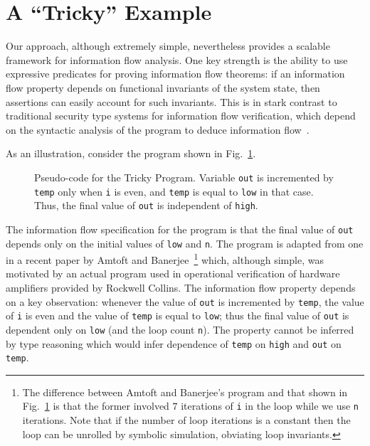 \documentclass[conference]{IEEEtran}
\begin{document}
\section{A ``Tricky'' Example}
\label{sec:tricky}

Our approach, although extremely simple, nevertheless provides a
scalable framework for information flow analysis.  One key strength is
the ability to use expressive predicates for proving information flow
theorems: if an information flow property depends on functional
invariants of the system state, then assertions can easily account for
such invariants.  This is in stark contrast to traditional security
type systems for information flow verification, which depend on the
syntactic analysis of the program to deduce information
flow~\cite{sm}.

As an illustration, consider the program shown in
Fig.~\ref{fig:tricky}.
\begin{figure}
\begin{center}
\fbox{
\begin{minipage}{3.0in}

\end{minipage}
}
\end{center}
\caption{Pseudo-code for the Tricky Program.  Variable {\tt out} is
incremented by {\tt temp} only when {\tt i} is even, and {\tt temp} is
equal to {\tt low} in that case.  Thus, the final value of {\tt out}
is independent of {\tt high}.}
\label{fig:tricky}
\end{figure}
The information flow specification for the program is that the final
value of {\tt out} depends only on the initial values of {\tt low} and
{\tt n}.  The program is adapted from one in a recent paper by Amtoft
and Banerjee~\cite{tricky}\footnote{The difference between Amtoft and
Banerjee's program and that shown in Fig.~\ref{fig:tricky} is that the
former involved $7$ iterations of {\tt i} in the loop while we use
{\tt n} iterations.  Note that if the number of loop iterations is a
constant then the loop can be unrolled by symbolic simulation,
obviating loop invariants.}  which, although simple, was motivated by
an actual program used in operational verification of hardware
amplifiers provided by Rockwell Collins.  The information flow
property depends on a key observation: whenever the value of {\tt out}
is incremented by {\tt temp}, the value of {\tt i} is even and the
value of {\tt temp} is equal to {\tt low}; thus the final value of
{\tt out} is dependent only on {\tt low} (and the loop count {\tt n}).
The property cannot be inferred by type reasoning which would infer
dependence of {\tt temp} on {\tt high} and {\tt out} on {\tt temp}.
\end{document}
